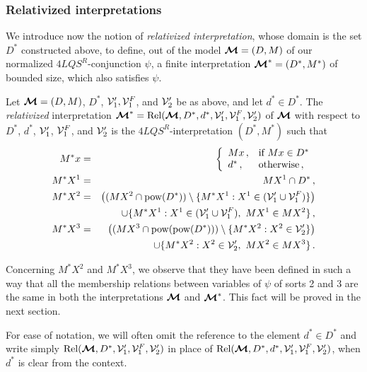 \documentclass{fundam}
\newcommand{\model}{\ensuremath{\mbox{\boldmath $\mathcal{M}$}}\xspace}
\newcommand{\pow}{\mbox{\rm pow}}
\newcommand{\Rel}{\mbox{\rm Rel}}
\newcommand{\QLQSR}{\ensuremath{\mbox{$4\mathit{LQS}^{R}$}}\xspace}
\begin{document}
\subsubsection{Relativized interpretations}
\label{machinery}
We introduce now the notion of \emph{relativized interpretation},
whose domain is the set $D^{*}$ constructed above, to define, out of
the model $\model = (D,M)$ of our normalized $\QLQSR$-conjunction
$\psi$, a finite interpretation $\model^* = (D^*,M^*)$ of bounded
size, which also satisfies $\psi$.

\begin{definition}\label{relintrp}
Let $\model=(D,M)$, $D^{*}$, ${\cal V}'_{1},{\cal V}_1^F$, and ${\cal
V}'_{2}$ be as above, and let $d^{*} \in D^{*}$.  The {\em
relativized\/} interpretation $\model^* =\Rel(\model, D^{*}, d^{*}, {\cal
V}'_{1}, {\cal V}_1^F, {\cal V}'_{2})$ of $\model$ with respect to
$D^{*}$, $d^{*}$, ${\cal V}'_{1}$, ${\cal V}_1^F$, and ${\cal V}'_{2}$
is the $\QLQSR$-interpretation $(D^{*},M^{*})$ such that
\begin{eqnarray*}
    M^{*}x & = & \left\{
    \begin{array}{ll}
        Mx\,, & \mbox{if $Mx \in D^{*}$}  \\
        d^{*}\,, & \mbox{otherwise}\, ,
    \end{array}
    \right.
    \\
    M^{*}X^1 & = & MX^1 \cap D^{*}\, ,
    \\
   M^{*}X^2  &=&
    \left((MX^2 \cap \pow(D^{*})) \setminus \{M^{*}X^1: X^1 \in
    ({\cal V}'_{1}\cup {\cal V}_1^F)\}\right)
    \\
     & & \qquad\cup \{M^{*}X^1: X^1 \in ({\cal V}'_{1} \cup {\cal V}_1^F),~MX^1 \in MX^2\}\, ,\\
M^{*}X^3  &=&
    \left((MX^3 \cap \pow(\pow(D^{*}))) \setminus \{M^{*}X^2: X^2 \in
    {\cal V}'_{2}\}\right)
     \\
     & & \qquad\cup \{M^{*}X^2: X^2 \in {\cal V}'_{2},~MX^2 \in MX^3\}\,.
\end{eqnarray*}
\end{definition}
Concerning $M^*X^2$ and $M^*X^3$, we observe that they have been
defined in such a way that all the membership relations between
variables of $\psi$ of sorts 2 and 3 are the same in both the
interpretations $\model$ and $\model^*$.  This fact will be proved
in the next section.


For ease of notation, we will often omit the reference to the element
$d^{*} \in D^{*}$ and write simply\/ $\Rel(\model, D^{*}, {\cal
V}'_{1}, {\cal V}_1^F, {\cal V}'_{2})$ in place of\/ $\Rel(\model,
D^{*}, d^{*}, {\cal V}'_{1}, {\cal V}_1^F, {\cal
V}'_{2})$, when $d^{*}$ is clear from the context.
\end{document}
